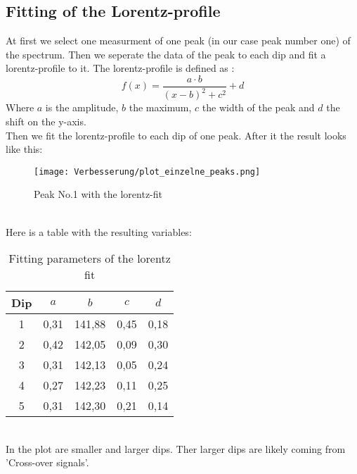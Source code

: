 \subsection{Fitting of the Lorentz-profile}
At first we select one measurment of one peak (in our case peak number one) of the spectrum.
Then we seperate the data of the peak to each dip and fit a lorentz-profile to it.
The lorentz-profile is defined as \citep[][]{Lorentzkurve-Wiki}:
\begin{equation}
    f(x)=\frac{a\cdot b}{(x-b)^2+c^2}+d
\end{equation}
Where $a$ is the amplitude, $b$ the maximum, $c$ the width of the peak and $d$ the shift on the y-axis.\\
Then we fit the lorentz-profile to each dip of one peak.\newpage
After it the result looks like this:
\begin{figure}[h]
    \centering\texttt{[image: Verbesserung/plot\_einzelne\_peaks.png]}
    \caption{Peak No.1 with the lorentz-fit}
\end{figure}\\
Here is a table with the resulting variables:
\begin{table}[h]
    \centering\begin{tabular}{c|cccc}
        Dip & $a$ & $b$ & $c$ & $d$\\\hline
        1 &0,31&141,88&0,45&0,18\\
        2 &0,42&142,05&0,09&0,30\\
        3 &0,31&142,13&0,05&0,24\\
        4 &0,27&142,23&0,11&0,25\\
        5 &0,31&142,30&0,21&0,14
    \end{tabular}
    \caption{Fitting parameters of the lorentz fit}
\end{table}\\
In the plot are smaller and larger dips.
Ther larger dips are likely coming from 'Cross-over signals'.\\

